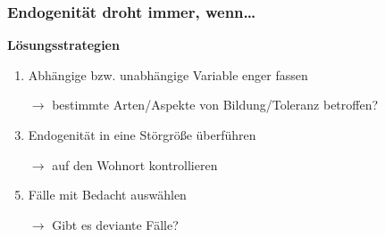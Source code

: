\documentclass{beamer}
\begin{document}
\begin{frame}
\frametitle{Endogenität droht immer, wenn\dots}

\textbf{Lösungsstrategien}
\begin{enumerate}
  \item Abhängige bzw. unabhängige Variable enger fassen
  \item [$\rightarrow$] bestimmte Arten/Aspekte von Bildung/Toleranz betroffen?
  \item Endogenität in eine Störgröße überführen
  \item [$\rightarrow$] auf den Wohnort kontrollieren
  \item Fälle mit Bedacht auswählen
  \item [$\rightarrow$] Gibt es deviante Fälle?
\end{enumerate}
\end{frame}
\end{document}
